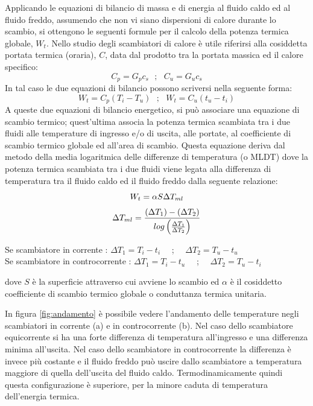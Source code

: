 \documentclass[laurea,oneside,11pt]{USiena_tesiLM}
\begin{document}
Applicando le equazioni di bilancio di massa e di energia al fluido caldo ed al fluido freddo, assumendo che non vi siano dispersioni di calore durante lo scambio, si ottengono le seguenti formule per il calcolo della potenza termica globale, $W_t$. Nello studio degli scambiatori di calore è  utile riferirsi alla cosiddetta portata termica (oraria), $C$, data dal prodotto tra la portata massica ed il calore specifico:
\begin{equation}
C_p=G_p c_s  \ \ \ ; \ \ \ C_u=G_u c_s
\end{equation}
In tal caso le due equazioni di bilancio  possono scriversi nella seguente forma:
\begin{equation}
W_t=C_p(T_i - T_u) \ \ \ ; \ \ \ W_t=C_u(t_u - t_i)
\end{equation}
A queste due equazioni di bilancio energetico, si può associare una equazione di scambio termico; quest'ultima associa la potenza termica scambiata tra i due fluidi alle temperature di ingresso e/o di uscita, alle portate, al coefficiente di scambio termico globale ed all'area di scambio. Questa equazione deriva dal metodo della media logaritmica delle differenze di temperatura (o MLDT) dove  la potenza termica scambiata tra i due fluidi viene legata alla differenza di temperatura tra il fluido caldo ed il fluido freddo dalla seguente relazione:
\begin{equation}
W_t=\alpha S \Delta T_{ml} \\
\end{equation}
\begin{equation}
 \Delta T_{ml} = \frac{(\Delta T_1)-(\Delta T_2)}{log\left( \frac{\Delta T_1}{\Delta T_2} \right)} \\
 \end{equation}
 \begin{center}
 Se scambiatore in corrente : $ \Delta T_1 = T_i - t_i $  \ \ ; \ \ $ \Delta T_2 = T_u - t_u $  \\
 
 Se scambiatore in controcorrente : $ \Delta T_1 = T_i - t_u $  \ \ ; \ \ $ \Delta T_2 = T_u - t_i $ 
\end{center}
dove $S$ \`e  la superficie attraverso cui avviene lo scambio ed $\alpha$ \`e  il cosiddetto coefficiente di scambio termico globale o conduttanza termica unitaria. 

In figura \ref{fig:andamento} è  possibile vedere l'andamento delle temperature negli scambiatori in corrente (a) e in controcorrente (b).
Nel caso dello scambiatore equicorrente si ha una forte differenza di temperatura all'ingresso e una differenza  minima  all'uscita.  Nel  caso  dello  scambiatore in controcorrente  la  differenza  è invece più costante e il fluido freddo può uscire dallo scambiatore a temperatura maggiore di  quella  dell'uscita del fluido  caldo. 
Termodinamicamente quindi  questa  configurazione  è superiore, per  la  minore  caduta di temperatura dell'energia termica.
\end{document}
